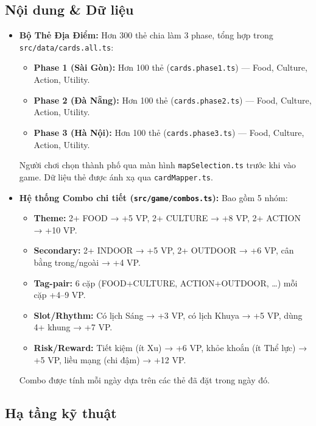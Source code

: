\subsection{Nội dung \& Dữ liệu}

\begin{itemize}[topsep=0pt, itemsep=2.5pt, leftmargin=1.5cm]
    \item \textbf{Bộ Thẻ Địa Điểm:} Hơn 300 thẻ chia làm 3 phase, tổng hợp trong \texttt{src/data/cards.all.ts}:

    \begin{itemize}[label=, leftmargin=1.5cm]
        \item \textbf{Phase 1 (Sài Gòn):} Hơn 100 thẻ (\texttt{cards.phase1.ts}) — Food, Culture, Action, Utility.
        \item \textbf{Phase 2 (Đà Nẵng):} Hơn 100 thẻ (\texttt{cards.phase2.ts}) — Food, Culture, Action, Utility.
        \item \textbf{Phase 3 (Hà Nội):} Hơn 100 thẻ (\texttt{cards.phase3.ts}) — Food, Culture, Action, Utility.
    \end{itemize}

    Người chơi chọn thành phố qua màn hình \texttt{mapSelection.ts} trước khi vào game. Dữ liệu thẻ được ánh xạ qua \texttt{cardMapper.ts}.

    \item \textbf{Hệ thống Combo chi tiết (\texttt{src/game/combos.ts}):} Bao gồm 5 nhóm:
    \begin{itemize}[label=, leftmargin=1.5cm]
        \item \textbf{Theme:} 2+ FOOD → +5 VP, 2+ CULTURE → +8 VP, 2+ ACTION → +10 VP.
        \item \textbf{Secondary:} 2+ INDOOR → +5 VP, 2+ OUTDOOR → +6 VP, cân bằng trong/ngoài → +4 VP.
        \item \textbf{Tag-pair:} 6 cặp (FOOD+CULTURE, ACTION+OUTDOOR, …) mỗi cặp +4–9 VP.
        \item \textbf{Slot/Rhythm:} Có lịch Sáng → +3 VP, có lịch Khuya → +5 VP, dùng 4+ khung → +7 VP.
        \item \textbf{Risk/Reward:} Tiết kiệm (ít Xu) → +6 VP, khỏe khoắn (ít Thể lực) → +5 VP, liều mạng (chi đậm) → +12 VP.
    \end{itemize}
    Combo được tính mỗi ngày dựa trên các thẻ đã đặt trong ngày đó.
\end{itemize}

\subsection{Hạ tầng kỹ thuật}

